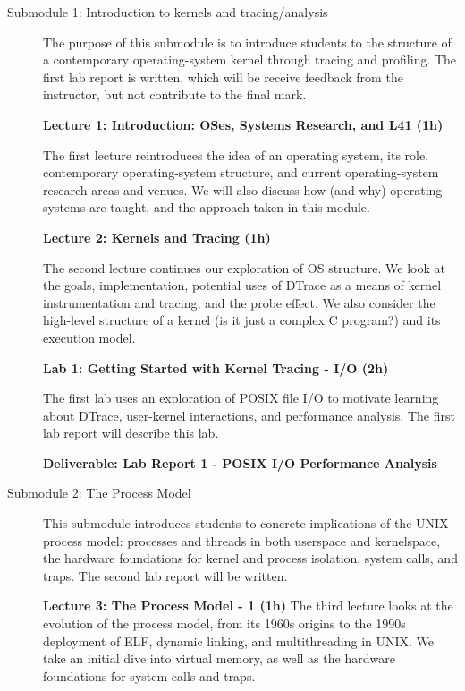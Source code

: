 \documentclass[a4paper,10pt]{article}
\begin{document}
\begin{description}
\item[Submodule 1: Introduction to kernels and tracing/analysis]
  The purpose of this submodule is to introduce students to the structure of
  a contemporary operating-system kernel through tracing and profiling.
  The first lab report is written, which will be receive feedback from the
  instructor, but not contribute to the final mark.

  \noindent
  \textbf{Lecture 1: Introduction: OSes, Systems Research, and L41 (1h)}

  The first lecture reintroduces the idea of an operating system, its
  role, contemporary operating-system structure, and current operating-system
  research areas and venues.
  We will also discuss how (and why) operating systems are taught, and the
  approach taken in this module.

  \noindent
  \textbf{Lecture 2: Kernels and Tracing (1h)}

  The second lecture continues our exploration of OS structure.
  We look at the goals, implementation, potential uses of DTrace as a means of
  kernel instrumentation and tracing, and the probe effect.
  We also consider the high-level structure of a kernel (is it just a complex
  C program?) and its execution model.


  \noindent
  \textbf{Lab 1: Getting Started with Kernel Tracing - I/O (2h)}

  The first lab uses an exploration of POSIX file I/O to motivate learning
  about DTrace, user-kernel interactions, and performance analysis.
  The first lab report will describe this lab.

  \noindent
  \textbf{Deliverable: Lab Report 1 - POSIX I/O Performance Analysis}

\item[Submodule 2: The Process Model]
  This submodule introduces students to concrete implications of the UNIX
  process model: processes and threads in both userspace and kernelspace, the
  hardware foundations for kernel and process isolation, system calls, and
  traps.
  The second lab report will be written.

  \noindent
  \textbf{Lecture 3: The Process Model - 1 (1h)}
  The third lecture looks at the evolution of the process model, from its
  1960s origins to the 1990s deployment of ELF, dynamic linking, and
  multithreading in UNIX.
  We take an initial dive into virtual memory, as well as the hardware
  foundations for system calls and traps.


\end{description}
\end{document}
